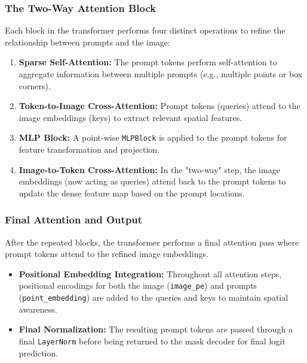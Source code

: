 \subsubsection{The Two-Way Attention Block}
Each block in the transformer performs four distinct operations to refine the relationship between prompts and the image:

\begin{enumerate}
	\item \textbf{Sparse Self-Attention:} The prompt tokens perform self-attention to aggregate information between multiple prompts (e.g., multiple points or box corners).
	
	\item \textbf{Token-to-Image Cross-Attention:} Prompt tokens (queries) attend to the image embeddings (keys) to extract relevant spatial features.
	
	\item \textbf{MLP Block:} A point-wise \texttt{MLPBlock} is applied to the prompt tokens for feature transformation and projection.
	
	\item \textbf{Image-to-Token Cross-Attention:} In the "two-way" step, the image embeddings (now acting as queries) attend back to the prompt tokens to update the dense feature map based on the prompt locations.
\end{enumerate}

\subsubsection{Final Attention and Output}
After the repeated blocks, the transformer performs a final attention pass where prompt tokens attend to the refined image embeddings.

\begin{itemize}
	\item \textbf{Positional Embedding Integration:} Throughout all attention steps, positional encodings for both the image (\texttt{image\_pe}) and prompts (\texttt{point\_embedding}) are added to the queries and keys to maintain spatial awareness.
	
	\item \textbf{Final Normalization:} The resulting prompt tokens are passed through a final \texttt{LayerNorm} before being returned to the mask decoder for final logit prediction.
\end{itemize}

